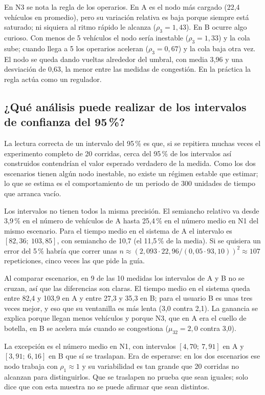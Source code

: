 \documentclass[11pt,letterpaper]{article}
\begin{document}
En N3 se nota la regla de los operarios. En A es el nodo más cargado (22,4 vehículos en promedio), pero su
variación relativa es baja porque siempre está saturado; ni siquiera al ritmo rápido le alcanza
($\rho_3 = 1{,}43$). En B ocurre algo curioso. Con menos de 5 vehículos el nodo sería inestable ($\rho_3 = 1{,}33$)
y la cola sube; cuando llega a 5 los operarios aceleran ($\rho_3 = 0{,}67$) y la cola baja otra vez. El nodo se
queda dando vueltas alrededor del umbral, con media 3,96 y una desviación de 0,63, la menor entre las medidas
de congestión. En la práctica la regla actúa como un regulador.

\subsection{¿Qué análisis puede realizar de los intervalos de confianza del 95\,\%?}

La lectura correcta de un intervalo del 95\,\% es que, si se repitiera muchas veces el experimento completo de
20 corridas, cerca del 95\,\% de los intervalos así construidos contendrían el valor esperado verdadero de la
medida. Como los dos escenarios tienen algún nodo inestable, no existe un régimen estable que estimar; lo que se
estima es el comportamiento de un periodo de 300 unidades de tiempo que arranca vacío.

Los intervalos no tienen todos la misma precisión. El semiancho relativo va desde 3,9\,\% en el número de
vehículos de A hasta 25,4\,\% en el número medio en N1 del mismo escenario. Para el tiempo medio en el sistema
de A el intervalo es $[82{,}36;\ 103{,}85]$, con semiancho de 10,7 (el 11,5\,\% de la media). Si se quisiera un
error del 5\,\% habría que correr unas $n \approx (2{,}093 \cdot 22{,}96 / (0{,}05 \cdot 93{,}10))^2 \approx 107$
repeticiones, cinco veces las que pide la guía.

Al comparar escenarios, en 9 de las 10 medidas los intervalos de A y B no se cruzan, así que las diferencias son
claras. El tiempo medio en el sistema queda entre 82,4 y 103,9 en A y entre 27,3 y 35,3 en B; para el usuario B
es unas tres veces mejor, y eso que su ventanilla es más lenta (3,0 contra 2,1). La ganancia se explica porque
llegan menos vehículos y porque N3, que en A era el cuello de botella, en B se acelera más cuando se congestiona
($\mu_{32} = 2{,}0$ contra 3,0).

La excepción es el número medio en N1, con intervalos $[4{,}70;\ 7{,}91]$ en A y $[3{,}91;\ 6{,}16]$ en B que sí
se traslapan. Era de esperarse: en los dos escenarios ese nodo trabaja con $\rho_1 \approx 1$ y su variabilidad es
tan grande que 20 corridas no alcanzan para distinguirlos. Que se traslapen no prueba que sean iguales; solo dice
que con esta muestra no se puede afirmar que sean distintos.
\end{document}
